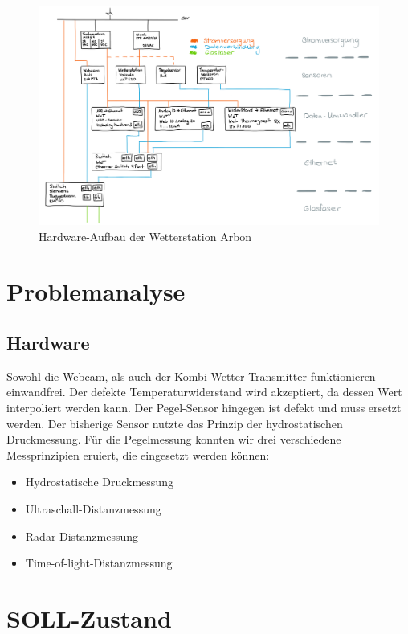 \begin{figure}[htbp]
	\centering
	\includegraphics[width=1\linewidth]{img/HW-Aufbau}
	\caption{Hardware-Aufbau der Wetterstation Arbon}
	\label{img:HW-Aufbau}
\end{figure}



\section{Problemanalyse}

\subsection{Hardware}
Sowohl die Webcam, als auch der Kombi-Wetter-Transmitter funktionieren einwandfrei. Der defekte Temperaturwiderstand wird akzeptiert, da dessen Wert interpoliert werden kann. Der Pegel-Sensor hingegen ist defekt und muss ersetzt werden. Der bisherige Sensor nutzte das Prinzip der hydrostatischen Druckmessung. Für die Pegelmessung konnten wir drei verschiedene Messprinzipien eruiert, die eingesetzt werden können:

\begin{itemize}  
\item Hydrostatische Druckmessung
\item Ultraschall-Distanzmessung
\item Radar-Distanzmessung
\item Time-of-light-Distanzmessung
\end{itemize}




\section{SOLL-Zustand}





